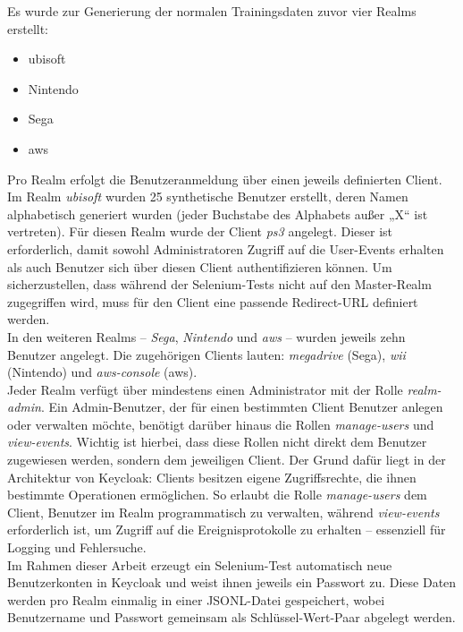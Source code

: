 \documentclass[a4paper,12pt]{article}
\begin{document}
	
	Es wurde zur Generierung der normalen Trainingsdaten zuvor vier Realms erstellt:
	
	\begin{itemize}
		\item ubisoft
		\item Nintendo
		\item Sega
		\item aws
	\end{itemize}
	
	Pro Realm erfolgt die Benutzeranmeldung über einen jeweils definierten Client.
	\\[0.5em]
	Im Realm \textit{ubisoft} wurden 25 synthetische Benutzer erstellt, deren Namen alphabetisch generiert wurden (jeder Buchstabe des Alphabets außer „X“ ist vertreten). Für diesen Realm wurde der Client \textit{ps3} angelegt. Dieser ist erforderlich, damit sowohl Administratoren Zugriff auf die User-Events erhalten als auch Benutzer sich über diesen Client authentifizieren können. Um sicherzustellen, dass während der Selenium-Tests nicht auf den Master-Realm zugegriffen wird, muss für den Client eine passende Redirect-URL definiert werden.
	\\[0.5em]
	In den weiteren Realms – \textit{Sega}, \textit{Nintendo} und \textit{aws} – wurden jeweils zehn Benutzer angelegt. Die zugehörigen Clients lauten: \textit{megadrive} (Sega), \textit{wii} (Nintendo) und \textit{aws-console} (aws).
	\\[0.5em]
	Jeder Realm verfügt über mindestens einen Administrator mit der Rolle \textit{realm-admin}. Ein Admin-Benutzer, der für einen bestimmten Client Benutzer anlegen oder verwalten möchte, benötigt darüber hinaus die Rollen \textit{manage-users} und \textit{view-events}. Wichtig ist hierbei, dass diese Rollen nicht direkt dem Benutzer zugewiesen werden, sondern dem jeweiligen Client. Der Grund dafür liegt in der Architektur von Keycloak: Clients besitzen eigene Zugriffsrechte, die ihnen bestimmte Operationen ermöglichen. So erlaubt die Rolle \textit{manage-users} dem Client, Benutzer im Realm programmatisch zu verwalten, während \textit{view-events} erforderlich ist, um Zugriff auf die Ereignisprotokolle zu erhalten – essenziell für Logging und Fehlersuche.
	\\[0.5em]
	Im Rahmen dieser Arbeit erzeugt ein Selenium-Test automatisch neue Benutzerkonten in Keycloak und weist ihnen jeweils ein Passwort zu. Diese Daten werden pro Realm einmalig in einer JSONL-Datei gespeichert, wobei Benutzername und Passwort gemeinsam als Schlüssel-Wert-Paar abgelegt werden.
\end{document}

